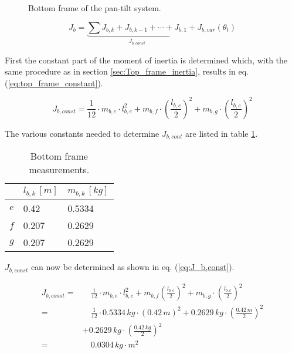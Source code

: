 \documentclass[../../main]{subfiles}
\begin{document}
\begin{figure}[H]
  \centering
  
  \caption{Bottom frame of the pan-tilt system.}
  \label{fig:BottomFrame}
\end{figure}

\begin{equation}
  \label{eq:Base_frame_eq}
  J_b =
  \underbrace{
  \sum J_{b,k} + J_{b,k-1} + \dotsb + J_{b,1}}_\text{$J_{b,const}$} + J_{b,var}(\theta_t)
\end{equation}

First the constant part of the moment of inertia is determined which, with the same procedure as in section \ref{sec:Top_frame_inertia}, results in eq. (\ref{eq:top_frame_constant}).

\begin{equation}
  \label{eq:top_frame_constant}
  J_{b,const} = \frac{1}{12}\cdot m_{b,e}\cdot l_{b,e}^2 + m_{b,f} \cdot \left( \frac{l_{b,e}}{2} \right)^2 + m_{b,g} \cdot \left(\frac{l_{b,e}}{2}\right)^2
\end{equation}

The various constants needed to determine $J_{b,cont}$ are listed in table \ref{tab:Base_frame_table}.

\begin{table}[H]
\centering
\begin{tabular}{|l|l|l|}
\hline
  & $l_{b,k} \, \si{[m]}$ & $m_{b,k} \, \si{[kg]}$ \\
\hline
$e$ & 0.42  & 0.5334  \\
\hline
$f$ & 0.207  & 0.2629  \\
\hline
$g$ & 0.207 & 0.2629  \\
\hline
\end{tabular}
\caption{Bottom frame measurements.}
    \label{tab:Base_frame_table}
\end{table}

$J_{b,const}$ can now be determined as shown in eq. (\ref{eq:J_b,const}).

\begin{equation}
  \label{eq:J_b,const}
  \begin{split}
      J_{b,const} =& \quad \frac{1}{12} \cdot m_{b,e} \cdot l_{b,e}^2 + m_{b,f} \left( \frac{l_{b,e}}{2} \right)^2 + m_{b,g} \cdot \left(\frac{l_{b,e}}{2}\right)^2\\
      =& \quad \frac{1}{12} \cdot 0.5334\si{\,kg} \cdot (0.42 \si{\,m})^2 + 0.2629\si{\,kg} \cdot \left( \frac{0.42 \si{\,m}}{2} \right)^2 \\
      &+ 0.2629 \si{\,kg}\cdot \left(\frac{0.42 \si{\,kg}}{2}\right)^2\\
      =& \quad 0.0304 \si{\,kg\cdot m^2}
  \end{split}
\end{equation}
\end{document}

